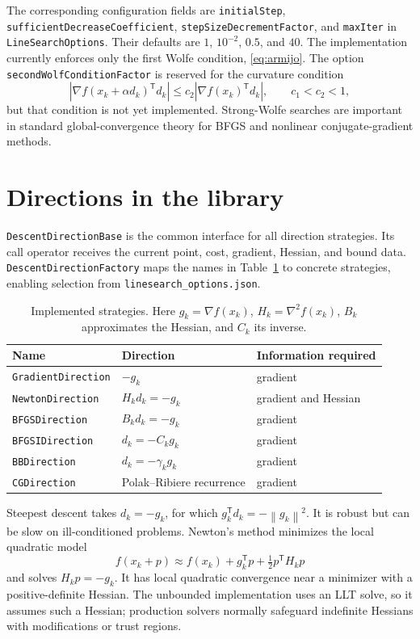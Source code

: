 \documentclass[11pt,a4paper]{article}
\newcommand{\grad}{\nabla}
\newcommand{\trans}{\mathsf{T}}
\newcommand{\norm}[1]{\left\lVert #1 \right\rVert}
\begin{document}
The corresponding configuration fields are
\texttt{initialStep}, \texttt{sufficientDecreaseCoefficient},
\texttt{stepSizeDecrementFactor}, and \texttt{maxIter} in
\texttt{LineSearchOptions}. Their defaults are $1$, $10^{-2}$, $0.5$, and
$40$. The implementation currently enforces only the first Wolfe condition,
\eqref{eq:armijo}. The option \texttt{secondWolfConditionFactor} is reserved
for the curvature condition
\[
 \left\lvert\grad f(x_k+\alpha d_k)^\trans d_k\right\rvert
 \leq c_2\left\lvert\grad f(x_k)^\trans d_k\right\rvert,
 \qquad c_1<c_2<1,
\]
but that condition is not yet implemented. Strong-Wolfe searches are important
in standard global-convergence theory for BFGS and nonlinear conjugate-gradient
methods.

\section{Directions in the library}

\texttt{DescentDirectionBase} is the common interface for all direction
strategies. Its call operator receives the current point, cost, gradient,
Hessian, and bound data. \texttt{DescentDirectionFactory} maps the names in
Table~\ref{tab:directions} to concrete strategies, enabling selection from
\texttt{linesearch\_options.json}.

\begin{table}[htbp]
\centering
\begin{tabular}{@{}lll@{}}
\toprule
Name & Direction & Information required \\
\midrule
\texttt{GradientDirection} & $-g_k$ & gradient \\
\texttt{NewtonDirection} & $H_kd_k=-g_k$ & gradient and Hessian \\
\texttt{BFGSDirection} & $B_kd_k=-g_k$ & gradient \\
\texttt{BFGSIDirection} & $d_k=-C_kg_k$ & gradient \\
\texttt{BBDirection} & $d_k=-\gamma_kg_k$ & gradient \\
\texttt{CGDirection} & Polak--Ribiere recurrence & gradient \\
\bottomrule
\end{tabular}
\caption{Implemented strategies. Here $g_k=\grad f(x_k)$,
$H_k=\grad^2f(x_k)$, $B_k$ approximates the Hessian, and $C_k$ its inverse.}
\label{tab:directions}
\end{table}

Steepest descent takes $d_k=-g_k$, for which
$g_k^\trans d_k=-\norm{g_k}^2$. It is robust but can be slow on
ill-conditioned problems. Newton's method minimizes the local quadratic model
\[
 f(x_k+p)\approx f(x_k)+g_k^\trans p+\tfrac12p^\trans H_kp
\]
and solves $H_kp=-g_k$. It has local quadratic convergence near a minimizer
with a positive-definite Hessian. The unbounded implementation uses an LLT
solve, so it assumes such a Hessian; production solvers normally safeguard
indefinite Hessians with modifications or trust regions.
\end{document}
